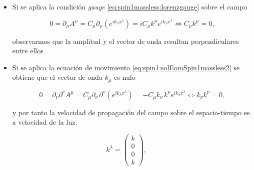 \begin{itemize}

	\item Si se aplica la condición \textit{gauge} \eqref{eq:spin1massless:lorenzgauge} sobre el campo 

	\begin{equation} \label{eq:Spin1massless:Condition1}
		0 = \partial_{\mu}A^{\mu} = 
		C_{\mu} \partial_{\mu} \left(e^{ik_{\lambda}x^{\lambda}}\right) = 
		iC_{\mu} k^{\mu} e^{ik_{\lambda}x^{\lambda}} \iff C_{\mu} k^{\mu} = 0,
	\end{equation}
	
	observarmos que la amplitud y el vector de onda resultan perpendiculares entre ellos

	\item Si se aplica la ecuación de movimiento \eqref{eq:spin1:solEomSpin1massless2} se obtiene que el vector de onda $k_{\mu}$ es nulo

	\begin{equation} \label{eq:Spin1massless:Condition2}
		0 = \partial_{\nu}\partial^{\nu}A^{\mu} = 
		C_{\mu} \partial_{\nu}\,\partial^{\nu} \left(e^{ik_{\lambda}x^{\lambda}}\right) = 
		-C_{\mu} k_{\nu}\,k^{\nu} e^{ik_{\lambda}x^{\lambda}} \iff k_{\nu}k^{\nu}= 0,
	\end{equation}

	y por tanto la velocidad de propagación del campo sobre el espacio-tiempo es a velocidad de la luz.

\end{itemize}




\begin{equation}
	k^{\lambda} = \begin{pmatrix}
					k \\
					0 \\
					0 \\
					k 
			        \end{pmatrix},
\end{equation}

